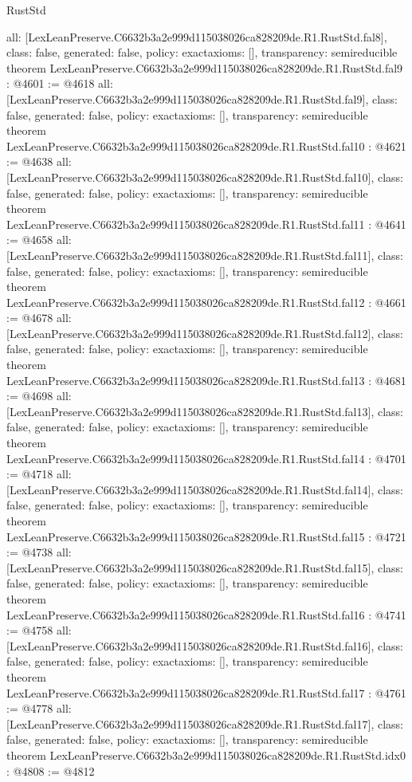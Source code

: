 \begin{lexlean}{RustStd}
\begin{coremodule}
{  all: [LexLeanPreserve.C6632b3a2e999d115038026ca828209de.R1.RustStd.fal8],
  class: false,
  generated: false,
  policy: exact{axioms: []},
  transparency: semireducible
}
theorem LexLeanPreserve.C6632b3a2e999d115038026ca828209de.R1.RustStd.fal9 : @4601 := @4618 {
  all: [LexLeanPreserve.C6632b3a2e999d115038026ca828209de.R1.RustStd.fal9],
  class: false,
  generated: false,
  policy: exact{axioms: []},
  transparency: semireducible
}
theorem LexLeanPreserve.C6632b3a2e999d115038026ca828209de.R1.RustStd.fal10 : @4621 := @4638 {
  all: [LexLeanPreserve.C6632b3a2e999d115038026ca828209de.R1.RustStd.fal10],
  class: false,
  generated: false,
  policy: exact{axioms: []},
  transparency: semireducible
}
theorem LexLeanPreserve.C6632b3a2e999d115038026ca828209de.R1.RustStd.fal11 : @4641 := @4658 {
  all: [LexLeanPreserve.C6632b3a2e999d115038026ca828209de.R1.RustStd.fal11],
  class: false,
  generated: false,
  policy: exact{axioms: []},
  transparency: semireducible
}
theorem LexLeanPreserve.C6632b3a2e999d115038026ca828209de.R1.RustStd.fal12 : @4661 := @4678 {
  all: [LexLeanPreserve.C6632b3a2e999d115038026ca828209de.R1.RustStd.fal12],
  class: false,
  generated: false,
  policy: exact{axioms: []},
  transparency: semireducible
}
theorem LexLeanPreserve.C6632b3a2e999d115038026ca828209de.R1.RustStd.fal13 : @4681 := @4698 {
  all: [LexLeanPreserve.C6632b3a2e999d115038026ca828209de.R1.RustStd.fal13],
  class: false,
  generated: false,
  policy: exact{axioms: []},
  transparency: semireducible
}
theorem LexLeanPreserve.C6632b3a2e999d115038026ca828209de.R1.RustStd.fal14 : @4701 := @4718 {
  all: [LexLeanPreserve.C6632b3a2e999d115038026ca828209de.R1.RustStd.fal14],
  class: false,
  generated: false,
  policy: exact{axioms: []},
  transparency: semireducible
}
theorem LexLeanPreserve.C6632b3a2e999d115038026ca828209de.R1.RustStd.fal15 : @4721 := @4738 {
  all: [LexLeanPreserve.C6632b3a2e999d115038026ca828209de.R1.RustStd.fal15],
  class: false,
  generated: false,
  policy: exact{axioms: []},
  transparency: semireducible
}
theorem LexLeanPreserve.C6632b3a2e999d115038026ca828209de.R1.RustStd.fal16 : @4741 := @4758 {
  all: [LexLeanPreserve.C6632b3a2e999d115038026ca828209de.R1.RustStd.fal16],
  class: false,
  generated: false,
  policy: exact{axioms: []},
  transparency: semireducible
}
theorem LexLeanPreserve.C6632b3a2e999d115038026ca828209de.R1.RustStd.fal17 : @4761 := @4778 {
  all: [LexLeanPreserve.C6632b3a2e999d115038026ca828209de.R1.RustStd.fal17],
  class: false,
  generated: false,
  policy: exact{axioms: []},
  transparency: semireducible
}
theorem LexLeanPreserve.C6632b3a2e999d115038026ca828209de.R1.RustStd.idx0 : @4808 := @4812 {
}
\end{coremodule}
\end{lexlean}
